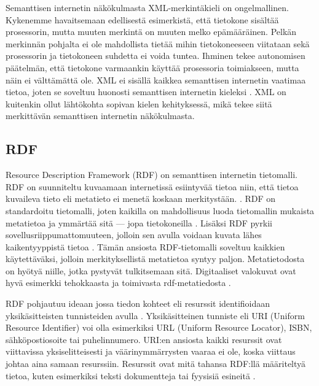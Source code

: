 \documentclass[finnish, 12pt, a4paper, elec, utf8, pdfa, online]{aaltothesis}
\begin{document}
 Semanttisen internetin näkökulmasta XML-merkintäkieli on ongelmallinen. Kykenemme havaitsemaan edellisestä esimerkistä, että tietokone sisältää prosessorin, mutta muuten merkintä on muuten melko epämääräinen. Pelkän merkinnän pohjalta ei ole mahdollista tietää mihin tietokoneeseen viitataan sekä prosessorin ja tietokoneen suhdetta ei voida tuntea. Ihminen tekee autonomisen päätelmän, että tietokone varmaankin käyttää prosessoria toimiakseen, mutta näin ei välttämättä ole. XML ei sisällä kaikkea semanttisen internetin vaatimaa tietoa, joten se soveltuu huonosti semanttisen internetin kieleksi \cite{IEEE_XML}. XML on kuitenkin ollut lähtökohta sopivan kielen kehityksessä, mikä tekee siitä merkittävän semanttisen internetin näkökulmasta.

\subsection{RDF}
Resource Description Framework (RDF) on semanttisen internetin tietomalli. RDF on suunniteltu kuvaamaan internetissä esiintyvää tietoa niin, että tietoa kuvaileva tieto eli metatieto ei menetä koskaan merkitystään. \cite{RDF_specification}. RDF on standardoitu tietomalli, joten kaikilla on mahdollisuus luoda tietomallin mukaista metatietoa ja ymmärtää sitä — jopa tietokoneilla \cite{metadata}. Lisäksi RDF pyrkii sovellusriippumattomuuteen, jolloin sen avulla voidaan kuvata lähes kaikentyyppistä tietoa \cite{RDF_specification}. Tämän ansiosta RDF-tietomalli soveltuu kaikkien käytettäväksi, jolloin merkityksellistä metatietoa syntyy paljon. Metatietodosta on hyötyä niille, jotka pystyvät tulkitsemaan sitä. Digitaaliset valokuvat ovat hyvä esimerkki tehokkaasta ja toimivasta rdf-metatiedosta  \cite{XMP} \cite{profium_metadata}.

RDF pohjautuu ideaan jossa tiedon kohteet eli resurssit identifioidaan yksikäsitteisten tunnisteiden avulla \cite{RDF_specification}. Yksikäsitteinen tunniste eli URI (Uniform Resource Identifier) voi olla esimerkiksi URL (Uniform Resource Locator), ISBN, sähköpostiosoite tai puhelinnumero. URI:en ansiosta kaikki resurssit ovat viittavissa yksiselitteisesti ja väärinymmärrysten vaaraa ei ole, koska viittaus johtaa aina samaan resurssiin. Resurssit ovat mitä tahansa RDF:llä määriteltyä tietoa, kuten esimerkiksi teksti dokumentteja tai fyysisiä esineitä \cite{RDF_specification}.
\end{document}

